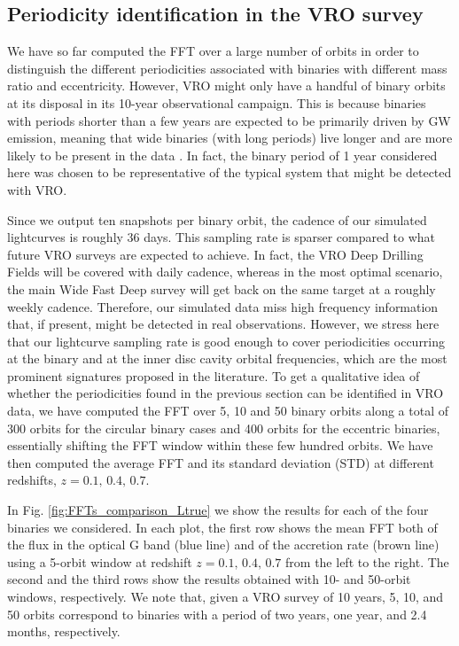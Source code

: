 \documentclass{aa}
\begin{document}

\subsection{Periodicity identification in the VRO survey}

We have so far computed the FFT over a large number of orbits in order to distinguish the different periodicities associated with binaries with different mass ratio and eccentricity. However, VRO might only have a handful of binary orbits at its disposal in its 10-year observational campaign. This is because binaries with periods shorter than a few years are expected to be primarily driven by GW emission, meaning that wide binaries (with long periods) live longer and are more likely to be present in the data \citep[see][]{Kelly2019}. In fact, the binary period of 1 year considered here was chosen to be representative of the typical system that might be detected with VRO. 

Since we output ten snapshots per binary orbit, the cadence of our simulated lightcurves is roughly 36 days. This sampling rate is sparser compared to what future VRO surveys are expected to  achieve. In fact, the VRO Deep Drilling Fields will be covered with daily cadence, whereas in the most optimal scenario, the main Wide Fast Deep survey will get back on the same target at a roughly weekly cadence.
Therefore, our simulated data miss high frequency information that, if present, might be detected in real observations. However, we stress here that our lightcurve sampling rate is good enough to cover periodicities occurring at the binary and at the inner disc cavity orbital frequencies, which are the most prominent signatures proposed in the literature.
To get a qualitative idea of whether the periodicities found in the previous section can be identified in VRO data, we have computed the FFT over 5, 10 and 50 binary orbits along a total of 300 orbits for the circular binary cases and 400 orbits for the eccentric binaries, essentially shifting the FFT window within these few hundred orbits. We have then computed the average FFT and its standard deviation (STD) at different redshifts, $z=0.1,\,0.4,\,0.7$.


In Fig. \ref{fig:FFTs_comparison_Ltrue} 
we show the results for each of the four binaries we considered. In each plot, the first row shows the mean FFT both of the flux in the optical G band (blue line) and of the accretion rate (brown line) using a 5-orbit window at redshift $z=0.1,\,0.4,\,0.7$ from the left to the right. The second and the third rows show the results obtained with 10- and 50-orbit windows, respectively. We note that, given a VRO survey of 10 years, 5, 10, and 50 orbits correspond to binaries with a period of two years, one year, and 2.4 months, respectively. 
\end{document}
